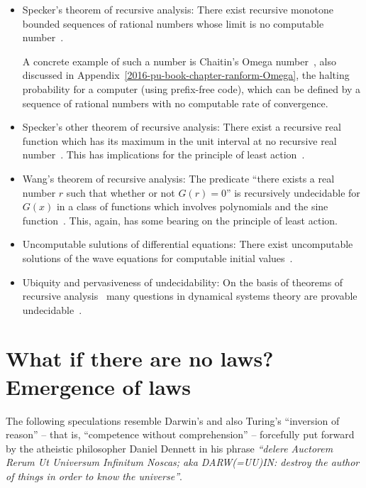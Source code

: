 \begin{itemize}
\item
{Specker's theorem of recursive analysis:}
There exist recursive monotone bounded sequences of rational numbers
whose limit is no computable number~\cite{Specker49}.

A concrete example of such a number is Chaitin's Omega number~\cite{chaitin3,calude:02,calude-dinneen06},
also discussed in Appendix~\ref{2016-pu-book-chapter-ranform-Omega},
the halting probability for a computer (using prefix-free code),
which can be defined by a sequence of rational numbers
with no computable rate of convergence.


\item
{Specker's other theorem of recursive analysis:}
There exist a recursive real function which has its maximum in the unit interval
at no recursive real number~\cite{specker57}.
This has implications for the principle of least action~\cite{kreisel}.


\item
{Wang's theorem of recursive analysis:}
The predicate ``there exists a real number $r$ such that whether or not $G(r) = 0$'' is recursively undecidable for $G(x)$
in a class of functions which involves polynomials and the sine function~\cite{wang}.
This, again, has some bearing on  the principle of least action.


\item
{Uncomputable sulutions of differential equations:}
There exist uncomputable solutions of the wave equations for computable initial values~\cite{pr1,bridges1}.

\item
{Ubiquity and pervasiveness of undecidability:}
On the basis of theorems of recursive analysis~\cite{Scarpellini-63,richardson68}
many questions in dynamical systems theory are provable undecidable~\cite{1985cfd..book.....F,dc-d93,Stewart-91,calude:037103}.


\end{itemize}

\chapter{What if there are no laws? Emergence of laws}
\label{2016-pu-book-chapter-pu-ch-emlaws}

The following speculations resemble Darwin's and also Turing's ``inversion of reason'' -- that is, ``competence without comprehension'' --
forcefully put forward by  the atheistic philosopher Daniel Dennett in his phrase
{\em ``delere Auctorem Rerum Ut Universum Infinitum Noscas; aka DARW(=UU)IN:  destroy the author of things in order to know the universe''}.

